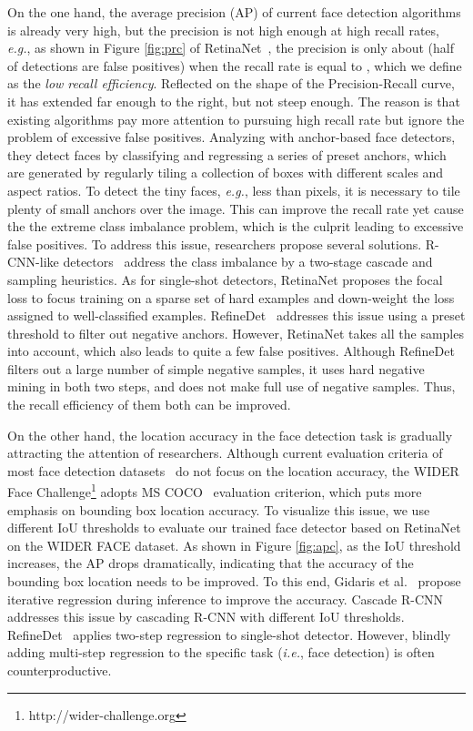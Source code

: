 \documentclass[letterpaper]{article} \usepackage{aaai19m}  \usepackage{times}  \usepackage{helvet}  \usepackage{courier}  \usepackage{url}  \usepackage{graphicx}  \usepackage{subfigure}
\def\ie{{\em i.e.}}
\def\eg{{\em e.g.}}
\begin{document}
On the one hand, the average precision (AP) of current face detection algorithms is already very high, but the precision is not high enough at high recall rates, \eg, as shown in Figure \ref{fig:prc} of RetinaNet~\cite{DBLP:conf/iccv/LinPRK17}, the precision is only about  (half of detections are false positives) when the recall rate is equal to , which we define as the \emph{low recall efficiency}. Reflected on the shape of the Precision-Recall curve, it has extended far enough to the right, but not steep enough. The reason is that existing algorithms pay more attention to pursuing high recall rate but ignore the problem of excessive false positives. Analyzing with anchor-based face detectors, they detect faces by classifying and regressing a series of preset anchors, which are generated by regularly tiling a collection of boxes with different scales and aspect ratios. To detect the tiny faces, \eg, less than  pixels, it is necessary to tile plenty of small anchors over the image. This can improve the recall rate yet cause the the extreme class imbalance problem, which is the culprit leading to excessive false positives. To address this issue, researchers propose several solutions. R-CNN-like detectors~\cite{DBLP:conf/iccv/Girshick15,DBLP:journals/pami/RenHG017} address the class imbalance by a two-stage cascade and sampling heuristics. As for single-shot detectors, RetinaNet proposes the focal loss to focus training on a sparse set of hard examples and down-weight the loss assigned to well-classified examples. RefineDet~\cite{DBLP:journals/corr/abs-1711-06897} addresses this issue using a preset threshold to filter out negative anchors. However, RetinaNet takes all the samples into account, which also leads to quite a few false positives. Although RefineDet filters out a large number of simple negative samples, it uses hard negative mining in both two steps, and does not make full use of negative samples. Thus, the recall efficiency of them both can be improved.

On the other hand, the location accuracy in the face detection task is gradually attracting the attention of researchers. Although current evaluation criteria of most face detection datasets~\cite{fddbTech,DBLP:conf/cvpr/YangLLT16} do not focus on the location accuracy, the WIDER Face Challenge\footnote{http://wider-challenge.org} adopts MS COCO~\cite{DBLP:conf/eccv/LinMBHPRDZ14} evaluation criterion, which puts more emphasis on bounding box location accuracy. To visualize this issue, we use different IoU thresholds to evaluate our trained face detector based on RetinaNet on the WIDER FACE dataset. As shown in Figure \ref{fig:apc}, as the IoU threshold increases, the AP drops dramatically, indicating that the accuracy of the bounding box location needs to be improved. To this end, Gidaris et al.~\cite{DBLP:conf/iccv/GidarisK15} propose iterative regression during inference to improve the accuracy. Cascade R-CNN~\cite{DBLP:journals/corr/abs-1712-00726} addresses this issue by cascading R-CNN with different IoU thresholds. RefineDet~\cite{DBLP:journals/corr/abs-1711-06897} applies two-step regression to single-shot detector. However, blindly adding multi-step regression to the specific task (\ie, face detection) is often counterproductive.
\end{document}
